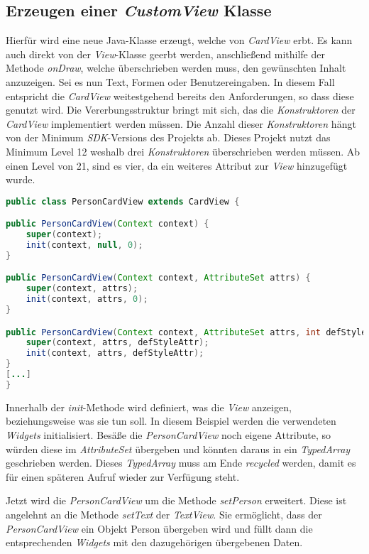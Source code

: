\subsection{Erzeugen einer \textit{CustomView} Klasse}

Hierfür wird eine neue Java-Klasse erzeugt, welche von \textit{CardView} erbt. Es kann auch direkt von der \textit{View}-Klasse geerbt werden, anschließend mithilfe der Methode \textit{onDraw}, welche überschrieben werden muss, den gewünschten Inhalt anzuzeigen. Sei es nun Text, Formen oder Benutzereingaben.
In diesem Fall entspricht die \textit{CardView} weitestgehend bereits den Anforderungen, so dass diese genutzt wird.
Die Vererbungsstruktur bringt mit sich, das die \textit{Konstruktoren} der \textit{CardView} implementiert werden müssen.
Die Anzahl dieser \textit{Konstruktoren} hängt von der Minimum \textit{SDK}-Versions des Projekts ab. Dieses Projekt nutzt das Minimum Level 12 weshalb drei \textit{Konstruktoren} überschrieben werden müssen. Ab einen Level von 21, sind es vier, da ein weiteres Attribut zur \textit{View} hinzugefügt wurde.

\begin{lstlisting}[label=lst:personCardView,
language=java,
firstnumber=1,
caption=\textit{Konstruktoren} der \textit{PersonCardView}]				  
public class PersonCardView extends CardView {

public PersonCardView(Context context) {
	super(context);
	init(context, null, 0);
}

public PersonCardView(Context context, AttributeSet attrs) {
	super(context, attrs);
	init(context, attrs, 0);
}

public PersonCardView(Context context, AttributeSet attrs, int defStyleAttr) {
	super(context, attrs, defStyleAttr);
	init(context, attrs, defStyleAttr);
}
[...]
}
\end{lstlisting}

Innerhalb der \textit{init}-Methode wird definiert, was die \textit{View} anzeigen, beziehungsweise was sie tun soll. 
In diesem Beispiel werden die verwendeten \textit{Widgets} initialisiert. Besäße die \textit{PersonCardView} noch eigene Attribute, so würden diese im \textit{AttributeSet} übergeben und könnten daraus in ein \textit{TypedArray} geschrieben werden. Dieses \textit{TypedArray} muss am Ende \textit{recycled} werden, damit es für einen späteren Aufruf wieder zur Verfügung steht.

Jetzt wird die \textit{PersonCardView} um die Methode \textit{setPerson} erweitert. Diese ist angelehnt an die Methode \textit{setText} der \textit{TextView}. Sie ermöglicht, dass der \textit{PersonCardView} ein Objekt Person übergeben wird und füllt dann die entsprechenden \textit{Widgets} mit den dazugehörigen übergebenen Daten.

